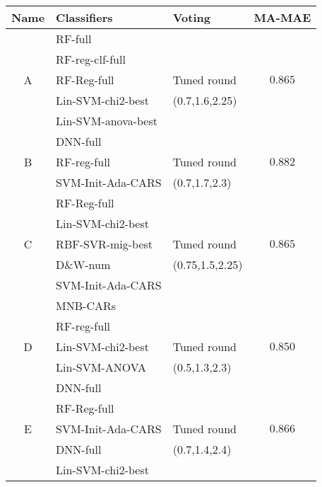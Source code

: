





\begin{table}
    \centering
    \begin{tabular}{|cllc|}
    \hline
    \textsf{Name}  & \textsf{Classifiers}& \textsf{Voting}&
    \textsf{MA-MAE}\\
    \hline
        & \textsf{RF-full}  &    & \\
        & \textsf{RF-reg-clf-full} &  &  \\
    \textsf{A}    & \textsf{RF-Reg-full} &   Tuned round & $0.865$\\
        & \textsf{Lin-SVM-chi2-best} &     (0.7,1.6,2.25)& \\
        & \textsf{Lin-SVM-anova-best} &  & \\
        & \textsf{DNN-full}& & \\
    \hline
    \textsf{B}    & \textsf{RF-reg-full} & Tuned round& $0.882$ \\
        & \textsf{SVM-Init-Ada-CARS} &   (0.7,1.7,2.3)& \\
    \hline
        & \textsf{RF-Reg-full} &  & \\
        & \textsf{Lin-SVM-chi2-best} & & \\
    \textsf{C}    & \textsf{RBF-SVR-mig-best} & Tuned round & $0.865$  \\
        & \textsf{D\&W-num} &   (0.75,1.5,2.25)& \\
        & \textsf{SVM-Init-Ada-CARS} & & \\
        & \textsf{MNB-CARs} & & \\
    \hline
         &  \textsf{RF-reg-full} & & \\
    \textsf{D}     &  \textsf{Lin-SVM-chi2-best} & Tuned round & $0.850$ \\
         &  \textsf{Lin-SVM-ANOVA}&  (0.5,1.3,2.3) & \\
         &  \textsf{DNN-full}  & & \\
    \hline
        & \textsf{RF-Reg-full} &  & \\
    \textsf{E}    & \textsf{SVM-Init-Ada-CARS} & Tuned round & $0.866$ \\
        & \textsf{DNN-full} &  (0.7,1.4,2.4) & \\
        & \textsf{Lin-SVM-chi2-best} & & \\
    \hline


\end{tabular}
\end{table}
